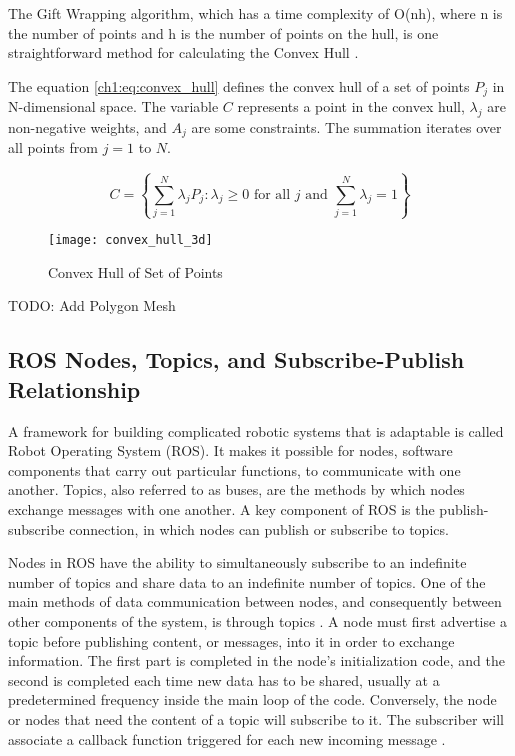 The Gift Wrapping algorithm, which has a time complexity of O(nh), where n is the number of points and h is the number of points on the hull, is one straightforward method for calculating the Convex Hull \citep{barber1996quickhull,chan1996optimal}.

The equation \ref{ch1:eq:convex_hull} defines the convex hull of a set of points $P_j$ in N-dimensional space. The variable $C$ represents a point in the convex hull, $\lambda_j$ are non-negative weights, and $A_j$ are some constraints. The summation iterates over all points from $j=1$ to $N$.

\begin{equation}
	\label{ch1:eq:convex_hull}
	C = \left\{ \sum_{j=1}^{N} \lambda_j P_j: \lambda_j \geq 0 \text{ for all } j \text{ and } \sum_{j=1}^{N} \lambda_j = 1 \right\}
\end{equation}




\begin{figure}[H]
	\centering
	\texttt{[image: convex\_hull\_3d]}
	\caption{Convex Hull of Set of Points}
	\label{ch1:fig:convex_hull_theory}
\end{figure}

TODO: Add Polygon Mesh

\subsection{ROS Nodes, Topics, and Subscribe-Publish Relationship}
A framework for building complicated robotic systems that is adaptable is called Robot Operating System (ROS). It makes it possible for nodes, software components that carry out particular functions, to communicate with one another. Topics, also referred to as buses, are the methods by which nodes exchange messages with one another. A key component of ROS is the publish-subscribe connection, in which nodes can publish or subscribe to topics.

Nodes in ROS have the ability to simultaneously subscribe to an indefinite number of topics and share data to an indefinite number of topics. One of the main methods of data communication between nodes, and consequently between other components of the system, is through topics \citep{St-Onge2022}. A node must first advertise a topic before publishing content, or messages, into it in order to exchange information. The first part is completed in the node's initialization code, and the second is completed each time new data has to be shared, usually at a predetermined frequency inside the main loop of the code. Conversely, the node or nodes that need the content of a topic will subscribe to it. The subscriber will associate a callback function triggered for each new incoming message \citep{St-Onge2022}.

